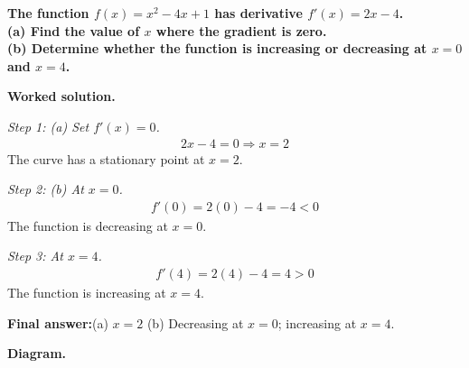 \documentclass[11pt]{article}
\newcommand{\question}[1]{\par\medskip\noindent\textbf{#1}\par}
\begin{document}
\question{The function \( f(x) = x^2 - 4x + 1 \) has derivative \( f'(x) = 2x - 4 \).\\[3pt]  (a) Find the value of \( x \) where the gradient is zero.\\[3pt]  (b) Determine whether the function is increasing or decreasing at \( x = 0 \) and \( x = 4 \).}

\textbf{Worked solution.}

\textit{Step 1: (a) Set \( f'(x) = 0 \).}
\[\begin{gathered}
2x - 4 = 0 \Rightarrow x = 2
\end{gathered}\]
The curve has a stationary point at \( x = 2 \).

\textit{Step 2: (b) At \( x = 0 \).}
\[\begin{gathered}
f'(0) = 2(0) - 4 = -4 < 0
\end{gathered}\]
The function is decreasing at \( x = 0 \).

\textit{Step 3: At \( x = 4 \).}
\[\begin{gathered}
f'(4) = 2(4) - 4 = 4 > 0
\end{gathered}\]
The function is increasing at \( x = 4 \).

\begin{answerbox}
\textbf{Final answer:}\quad (a) \(\displaystyle  x = 2 \) \quad  (b) Decreasing at \(\displaystyle  x = 0 \); increasing at \(\displaystyle  x = 4 \).
\end{answerbox}
\textbf{Diagram.}
\end{document}
